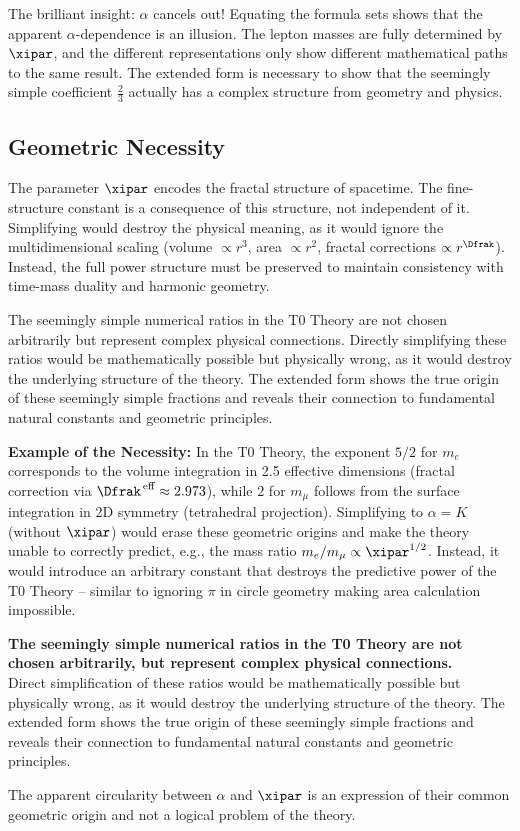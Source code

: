 	The brilliant insight: $\alpha$ cancels out! Equating the formula sets shows that the apparent $\alpha$-dependence is an illusion. The lepton masses are fully determined by $\xipar$, and the different representations only show different mathematical paths to the same result. The extended form is necessary to show that the seemingly simple coefficient $\frac{2}{3}$ actually has a complex structure from geometry and physics.
	
	\subsection{Geometric Necessity}
	
	The parameter $\xipar$ encodes the fractal structure of spacetime. The fine-structure constant is a consequence of this structure, not independent of it. Simplifying would destroy the physical meaning, as it would ignore the multidimensional scaling (volume $\propto r^3$, area $\propto r^2$, fractal corrections $\propto r^{\Dfrak}$). Instead, the full power structure must be preserved to maintain consistency with time-mass duality and harmonic geometry.
	
	The seemingly simple numerical ratios in the T0 Theory are not chosen arbitrarily but represent complex physical connections. Directly simplifying these ratios would be mathematically possible but physically wrong, as it would destroy the underlying structure of the theory. The extended form shows the true origin of these seemingly simple fractions and reveals their connection to fundamental natural constants and geometric principles.
	
	\textbf{Example of the Necessity:} In the T0 Theory, the exponent $5/2$ for $m_e$ corresponds to the volume integration in 2.5 effective dimensions (fractal correction via $\Dfrak^{\,\text{eff}} \approx 2.973$), while $2$ for $m_\mu$ follows from the surface integration in 2D symmetry (tetrahedral projection). Simplifying to $\alpha = K$ (without $\xipar$) would erase these geometric origins and make the theory unable to correctly predict, e.g., the mass ratio $m_e/m_\mu \propto \xipar^{1/2}$. Instead, it would introduce an arbitrary constant that destroys the predictive power of the T0 Theory – similar to ignoring $\pi$ in circle geometry making area calculation impossible.
	
	\begin{tcolorbox}[colback=blue!5!white,colframe=blue!75!black,title=Key Result]
		\textbf{The seemingly simple numerical ratios in the T0 Theory are not chosen arbitrarily, but represent complex physical connections.} \\
		
		Direct simplification of these ratios would be mathematically possible but physically wrong, as it would destroy the underlying structure of the theory. The extended form shows the true origin of these seemingly simple fractions and reveals their connection to fundamental natural constants and geometric principles.
		
		The apparent circularity between $\alpha$ and $\xipar$ is an expression of their common geometric origin and not a logical problem of the theory.
	\end{tcolorbox}
